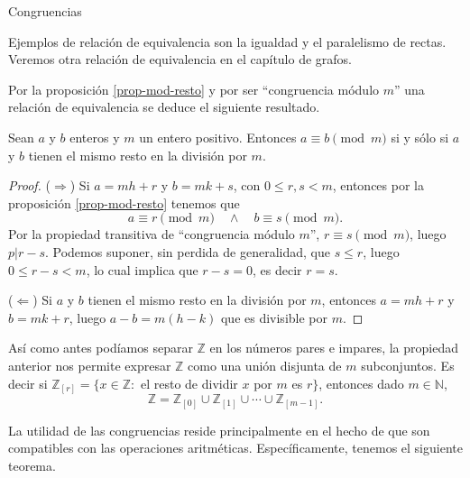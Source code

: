 \begin{section}{Congruencias}
\begin{observacion*}
    Ejemplos de relación de equivalencia son la igualdad y  el paralelismo de rectas. Veremos otra relación de equivalencia en el capítulo de grafos.
\end{observacion*}

Por la proposición \ref{prop-mod-resto} y por ser ``congruencia módulo $m$'' una relación de equivalencia se deduce el siguiente resultado. 

\begin{proposicion}
Sean $a$ y $b$ enteros y $m$ un entero positivo. Entonces $a\equiv b \pmod{m}$ si  y sólo si $a$ y $b$ tienen el mismo resto en la división por $m$.
\end{proposicion}
\begin{proof} ($\Rightarrow$)
Si $a=mh+r$ y $b=mk+s$, con $0 \le r,s <m$, entonces por la proposición \ref{prop-mod-resto} tenemos que
\begin{equation*}
    a \equiv r \pmod{m} \quad \wedge \quad     b \equiv s \pmod{m}.
\end{equation*}
Por la propiedad transitiva de ``congruencia módulo $m$'', $ r \equiv s \pmod{m}$, luego $p | r-s$.  Podemos suponer, sin perdida de generalidad, que $s \le r$, luego $0\le r-s< m$, lo cual implica que $r-s=0$,  es decir $r=s$. 

($\Leftarrow$) Si $a$ y $b$ tienen el mismo resto en la división por $m$, entonces  $a=mh+r$ y $b=mk+r$, luego $a-b = m(h-k)$ que es divisible por $m$.
\end{proof}

Así como antes podíamos separar $\mathbb Z$ en los números pares e impares, la propiedad anterior nos permite expresar $\mathbb Z$ como una unión disjunta de $m$ subconjuntos. Es decir si $\mathbb  Z_{[r]} =\{x \in \mathbb Z:$ el resto de dividir $x$ por $m$ es $r\}$, entonces dado $m \in \mathbb N$, 
$$
\mathbb Z= \mathbb Z_{[0]}\cup \mathbb Z_{[1]}\cup \cdots\cup \mathbb Z_{[m-1]}.
$$




La utilidad de las congruencias reside principalmente en el hecho de que son compatibles con las operaciones aritméticas. Específicamente, tenemos el siguiente teorema.


\end{section}

